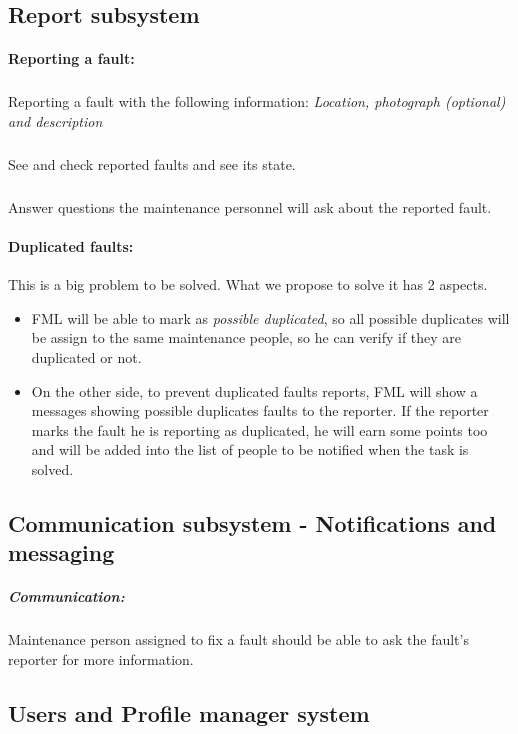 \subsection{Report subsystem}

\paragraph{Reporting a fault: } 


\subparagraph{} Reporting a fault with the following information: \textit{Location, photograph (optional) and description}

\subparagraph{} See and check reported faults and see its state.

\subparagraph{} Answer questions the maintenance personnel will ask about the reported fault.



\paragraph{Duplicated faults: } This is a big problem to be solved. What we propose to solve it has 2 aspects.
\begin{itemize}
\item FML will be able to mark as \textit{possible duplicated}, so all possible duplicates will be assign to the same maintenance people, so he can verify if they are duplicated or not.

\item On the other side, to prevent duplicated faults reports, FML will show a messages showing possible duplicates faults to the reporter. If the reporter marks the fault he is reporting as duplicated, he will earn some points too and will be added into the list of people to be notified when the task is solved.
\end{itemize}


\subsection{Communication subsystem - Notifications and messaging}

\subparagraph{Communication: } Maintenance person assigned to fix a fault should be able to ask the fault's reporter for more information.


\subsection{Users and Profile manager system}

